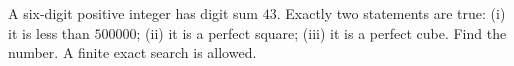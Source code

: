A six-digit positive integer has digit sum $43$. Exactly two statements are true: (i) it is less than $500000$; (ii) it is a perfect square; (iii) it is a perfect cube. Find the number. A finite exact search is allowed.
